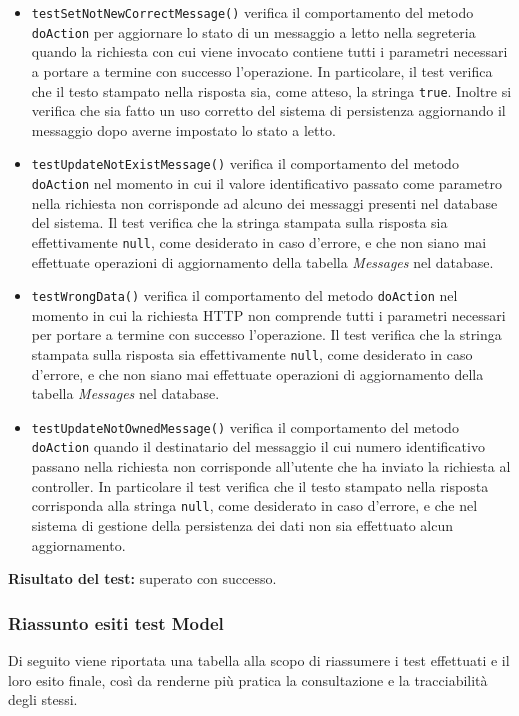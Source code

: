 \begin{itemize}
\begin{itemize}
\item \texttt{testSetNotNewCorrectMessage()} verifica il comportamento del metodo \texttt{doAction} per aggiornare lo stato di un messaggio a letto nella segreteria quando la richiesta con cui viene invocato contiene tutti i parametri necessari a portare a termine con successo l'operazione. In particolare, il test verifica che il testo stampato nella risposta sia, come atteso, la stringa \texttt{true}. Inoltre si verifica che sia fatto un uso corretto del sistema di persistenza aggiornando il messaggio dopo averne impostato lo stato a letto.

\item \texttt{testUpdateNotExistMessage()} verifica il comportamento del metodo \texttt{doAction} nel momento in cui il valore identificativo passato come parametro nella richiesta non corrisponde ad alcuno dei messaggi presenti nel database del sistema. Il test verifica che la stringa stampata sulla risposta sia effettivamente \texttt{null}, come desiderato in caso d'errore, e che non siano mai effettuate operazioni di aggiornamento della tabella \textit{Messages} nel database.

\item \texttt{testWrongData()} verifica il comportamento del metodo \texttt{doAction} nel momento in cui la richiesta HTTP non comprende tutti i parametri necessari per portare a termine con successo l'operazione. Il test verifica che la stringa stampata sulla risposta sia effettivamente \texttt{null}, come desiderato in caso d'errore, e che non siano mai effettuate operazioni di aggiornamento della tabella \textit{Messages} nel database.

\item \texttt{testUpdateNotOwnedMessage()} verifica il comportamento del metodo \texttt{doAction} quando il destinatario del messaggio il cui numero identificativo passano nella richiesta non corrisponde all'utente che ha inviato la richiesta al controller. In particolare il test verifica che il testo stampato nella risposta corrisponda alla stringa \texttt{null}, come desiderato in caso d'errore, e che nel sistema di gestione della persistenza dei dati non sia effettuato alcun aggiornamento.

\end{itemize} 
\textbf{Risultato del test:} superato con successo.

\end{itemize}
\clearpage
\subsubsection{Riassunto esiti test Model}
Di seguito viene riportata una tabella alla scopo di riassumere i test effettuati e il loro esito finale, così da renderne più pratica la consultazione e la tracciabilità degli stessi.

